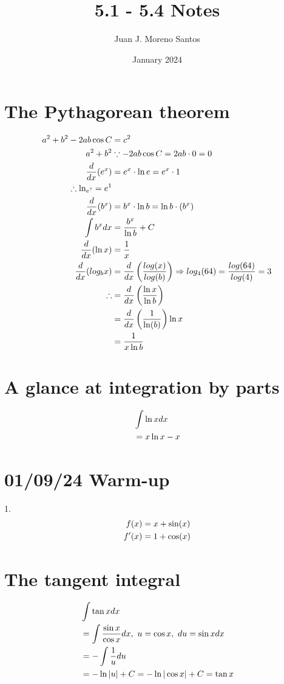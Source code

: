 \documentclass[11pt]{article}
\newcommand*{\set}{\setcounter{equation}{0}}
\newcommand*{\lt}{\left}
\newcommand*{\rt}{\right}
\begin{document}
\title{5.1 - 5.4 Notes}
\author{Juan J. Moreno Santos}
\date{January 2024}

\maketitle
\section{The Pythagorean theorem}
\begin{align}
    \set
    a^2+b^2-2ab\cos C&=c^2\\
    a^2+b^2&\because -2ab\cos C=2ab\cdot 0=0\\
    \frac{d}{dx}(e^x)&=e^x\cdot \ln e=e^x\cdot 1\\
    \therefore \ln_{e^?}=e^1\\
    \frac{d}{dx}(b^x)&=b^x\cdot \ln b=\ln b\cdot (b^x)\\
    \int b^xdx&=\frac{b^x}{\ln b}+C\\
    \frac{d}{dx}(\ln x)&=\frac{1}{x}\\
    \frac{d}{dx}(log_bx)&=\frac{d}{dx}\lt(\frac{log(x)}{log(b)}\rt)\Rightarrow log_4(64)=\frac{log(64)}{log(4)}=3\\
    \therefore &=\frac{d}{dx}\lt(\frac{\ln x}{\ln b}\rt)\\
    &=\frac{d}{dx}\lt(\frac{1}{\ln(b)}\rt)\ln x\\
    &=\frac{1}{x\ln b}
\end{align}

\section{A glance at integration by parts}
\begin{align}
    \set
    &\int\ln xdx\\
    &=x\ln x-x
\end{align}

\section{01/09/24 Warm-up}
1.\begin{align}
    \set
    f(x)&=x+\sin(x)\\
    f'(x)&=1+\cos(x)
\end{align}

\section{The tangent integral}
\begin{align}
    \set
    &\int\tan xdx\\
    &=\int\frac{\sin x}{\cos x}dx,\,\, u=\cos x,\,\, du=\sin xdx\\
    &=-\int\frac{1}{u}du\\
    &=-\ln|u|+C=-\ln|\cos x|+C=\tan x
\end{align}
\end{document}
